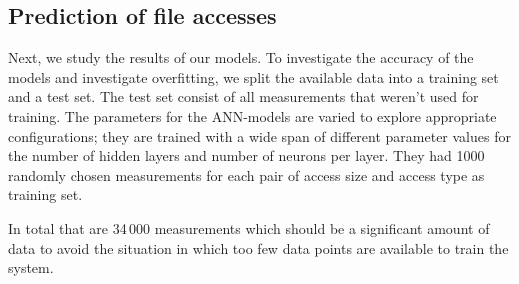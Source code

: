 \documentclass{superfri}
\begin{document}
\subsection{Prediction of file accesses}
Next, we study the results of our models.
To investigate the accuracy of the models and investigate overfitting, we split the available data into a training set and a test set. 
The test set consist of all measurements that weren't used for training.
The parameters for the ANN-models are varied to explore appropriate configurations; they are trained with a wide span of different parameter values for the number of hidden layers and number of neurons per layer.
They had 1000 randomly chosen measurements for each pair of access size and access type as training set. %
%

In total that are 34\,000 measurements which should be a significant amount of data to avoid the situation in which too few data points are available to train the system. 

\medskip
\end{document}
